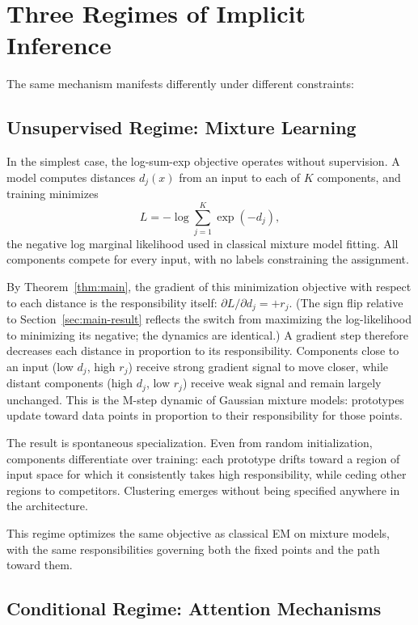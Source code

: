 \section{Three Regimes of Implicit Inference}
\label{sec:regimes}

The same mechanism manifests differently under different constraints:

\subsection{Unsupervised Regime: Mixture Learning}

In the simplest case, the log-sum-exp objective operates without supervision. A model computes distances $d_j(x)$ from an input to each of $K$ components, and training minimizes
\begin{equation}
L = -\log \sum_{j=1}^{K} \exp(-d_j),
\end{equation}
the negative log marginal likelihood used in classical mixture model fitting. All components compete for every input, with no labels constraining the assignment.

By Theorem~\ref{thm:main}, the gradient of this minimization objective with respect to each distance is the responsibility itself: $\partial L / \partial d_j = +r_j$. (The sign flip relative to Section~\ref{sec:main-result} reflects the switch from maximizing the log-likelihood to minimizing its negative; the dynamics are identical.) A gradient step therefore decreases each distance in proportion to its responsibility. Components close to an input (low $d_j$, high $r_j$) receive strong gradient signal to move closer, while distant components (high $d_j$, low $r_j$) receive weak signal and remain largely unchanged. This is the M-step dynamic of Gaussian mixture models: prototypes update toward data points in proportion to their responsibility for those points.

The result is spontaneous specialization. Even from random initialization, components differentiate over training: each prototype drifts toward a region of input space for which it consistently takes high responsibility, while ceding other regions to competitors. Clustering emerges without being specified anywhere in the architecture.

This regime optimizes the same objective as classical EM on mixture models, with the same responsibilities governing both the fixed points and the path toward them.

\subsection{Conditional Regime: Attention Mechanisms}
\label{sec:attention}

